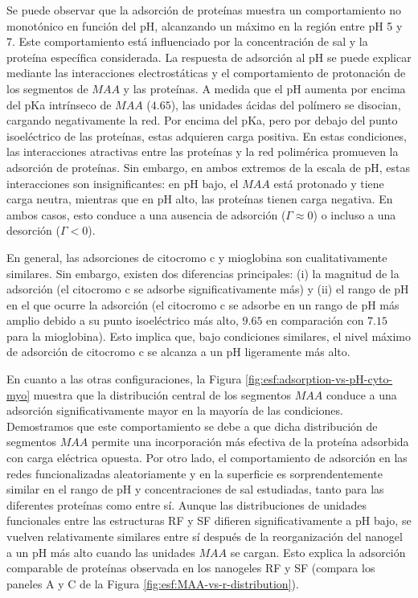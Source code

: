  Se puede observar que la adsorci\'on de prote\'inas muestra un comportamiento no monot\'onico en funci\'on del pH, alcanzando un m\'aximo en la regi\'on entre pH 5 y 7. Este comportamiento est\'a influenciado por la concentraci\'on de sal y la prote\'ina espec\'ifica considerada. La respuesta de adsorci\'on al pH se puede explicar mediante las interacciones electrost\'aticas y el comportamiento de protonaci\'on de los segmentos de $MAA$ y las prote\'inas. A medida que el pH aumenta por encima del pKa intr\'inseco de $MAA$ ($4.65$), las unidades \'acidas del pol\'imero se disocian, cargando negativamente la red. Por encima del pKa, pero por debajo del punto isoel\'ectrico de las prote\'inas, estas adquieren carga positiva. En estas condiciones, las interacciones atractivas entre las prote\'inas y la red polim\'erica promueven la adsorci\'on de prote\'inas. Sin embargo, en ambos extremos de la escala de pH, estas interacciones son insignificantes: en pH bajo, el $MAA$ est\'a protonado y tiene carga neutra, mientras que en pH alto, las prote\'inas tienen carga negativa. En ambos casos, esto conduce a una ausencia de adsorci\'on ($\Gamma \approx 0$) o incluso a una desorci\'on ($\Gamma < 0$).
 
 
 
 
En general, las adsorciones de citocromo c y mioglobina son cualitativamente similares. Sin embargo, existen dos diferencias principales: (i) la magnitud de la adsorci\'on (el citocromo c se adsorbe significativamente m\'as) y (ii) el rango de pH en el que ocurre la adsorci\'on (el citocromo c se adsorbe en un rango de pH m\'as amplio debido a su punto isoel\'ectrico m\'as alto, $9.65$ en comparaci\'on con $7.15$ para la mioglobina). Esto implica que, bajo condiciones similares, el nivel m\'aximo de adsorci\'on de citocromo c se alcanza a un pH ligeramente m\'as alto.

En cuanto a las otras configuraciones, la Figura \ref{fig:esf:adsorption-vs-pH-cyto-myo} muestra que la distribuci\'on central de los segmentos $MAA$ conduce a una adsorci\'on significativamente mayor en la mayor\'ia de las condiciones. Demostramos que este comportamiento se debe a que dicha distribuci\'on de segmentos $MAA$ permite una incorporaci\'on m\'as efectiva de la prote\'ina adsorbida con carga el\'ectrica opuesta. Por otro lado, el comportamiento de adsorci\'on en las redes funcionalizadas aleatoriamente y en la superficie es sorprendentemente similar en el rango de pH y concentraciones de sal estudiadas, tanto para las diferentes prote\'inas como entre s\'i. Aunque las distribuciones de unidades funcionales entre las estructuras RF y SF difieren significativamente a pH bajo, se vuelven relativamente similares entre s\'i despu\'es de la reorganizaci\'on del nanogel a un pH m\'as alto cuando las unidades $MAA$ se cargan. Esto explica la adsorci\'on comparable de prote\'inas observada en los nanogeles RF y SF (compara los paneles A y C de la Figura \ref{fig:esf:MAA-vs-r-distribution}).



